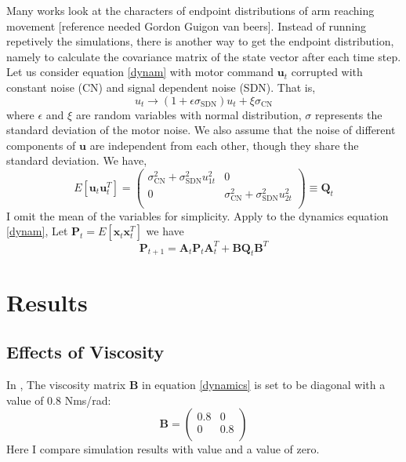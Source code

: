 Many works look at the characters of endpoint distributions of arm reaching movement [reference needed Gordon Guigon van beers]. Instead of running repetively the simulations, there is another way to get the endpoint distribution, namely to calculate the covariance matrix of the state vector after each time step. Let us consider equation \ref{dynam} with motor command $\bm{u}_t$ corrupted with constant noise (CN) and signal dependent noise (SDN). That is,
\begin{equation}
u_t \rightarrow (1 + \epsilon\sigma_{\text{SDN}}) u_t + \xi\sigma_{\text{CN}}
\end{equation}
where $\epsilon$ and $\xi$ are random variables with normal distribution, $\sigma$ represents the standard deviation of the motor noise. We also assume that the noise of different components of $\bm{u}$ are independent from each other, though they share the standard deviation. We have,
\begin{equation}
	E[\bm{u}_t\bm{u}_t^T] = 
	\left(\begin{matrix}
		\sigma_{\text{CN}}^2 + 		\sigma_{\text{SDN}}^2 u_{1t}^2   &  0 \\
		0  &   \sigma_{\text{CN}}^2 + 		\sigma_{\text{SDN}}^2 u_{2t}^2   \\
	\end{matrix}\right)  \equiv \bm{Q}_t
\end{equation}
I omit the mean of the variables for simplicity. Apply to the dynamics equation \ref{dynam}, Let $\bm{P}_t = E[\bm{x}_{t}\bm{x}_{t}^T]$ we have
\begin{equation}
	\bm{P}_{t+1} = \bm{A}_t \bm{P}_t\bm{A}_t^T + \bm{B}\bm{Q}_t\bm{B}^T
\end{equation}

\section{Results}\label{results}
\subsection{Effects of Viscosity}
In \cite{van2004role}, The viscosity matrix $\bm{B}$ in equation \ref{dynamics} is set to be diagonal with a value of 0.8 Nms/rad:
\begin{equation}
	\bm{B} = 
	\left(\begin{matrix}
	0.8 & 0 \\
	0 & 0.8 \\
	\end{matrix}\right)
\end{equation}
Here I compare simulation results with \cite{van2004role} value and a value of zero.

